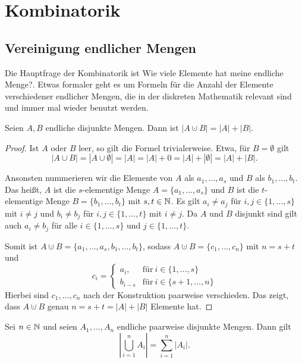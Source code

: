 \chapter{Kombinatorik} 

\section{Vereinigung endlicher Mengen} 

\begin{bem}
	Die Hauptfrage der Kombinatorik ist \glqq Wie viele Elemente hat meine endliche Menge?\grqq. Etwas formaler geht es um Formeln für die Anzahl der Elemente verschiedener endlicher Mengen, die in der diskreten Mathematik relevant sind und immer mal wieder benutzt werden.
\end{bem} 

\begin{lem} \label{lem:vereinigung:zwei}
	Seien $A, B$ endliche disjunkte Mengen. Dann ist $|A \cupdot B| = |A| + |B|$. 
\end{lem} 

\begin{proof}
	Ist $A$ oder $B$ leer, so gilt die Formel trivialerweise. Etwa, für $B = \emptyset$ gilt 
	\[
		|A \cup B| = | A \cup \emptyset| = |A| = |A| + 0 = |A| + | \emptyset| = |A| + |B|. 
	\]
	
	 Ansonsten nummerieren wir die Elemente von $A$ als $a_1,\ldots,a_s$ und $B$ als $b_1,\ldots,b_t$. Das heißt, $A$ ist die $s$-elementige Menge $A = \{a_1,\ldots,a_s\}$ und $B$ ist die $t$-elementige Menge $B = \{b_1,\ldots,b_t\}$ mit $s,t \in \mathbb{N}$. Es gilt $a_i \ne a_j$ für $i,j \in \{1,\ldots,s\}$ mit $i \ne j$   und $b_i \ne b_j$ für  $i,j \in \{1,\ldots,t\}$ mit $i \ne j$. Da $A$ und $B$ disjunkt sind gilt auch $a_i \ne b_j$ für alle $i \in \{1,\ldots,s\}$ und $j \in \{1,\ldots,t\}$. 
	 
	 Somit ist 
	 $A \cupdot B = \{a_1,\ldots,a_s,b_1,\ldots,b_t\}$, sodass $A \cupdot B = \{c_1,\ldots,c_n\}$ mit $n = s + t$ und 
	 \[
	 	c_i = \begin{cases}
	 		 a_i, & \text{für} \ i \in\{1,\ldots,s\}
	 		 \\b_{i-s}  &  \text{für} \ i \in \{s+1,\ldots,n\}
	 		\end{cases}
 	\] 
 	Hierbei sind $c_1,\ldots,c_n$ nach der Konstruktion paarweise verschieden. Das zeigt, dass $A \cupdot B$ genau $n = s+t = |A| + |B|$ Elemente hat. 
\end{proof}

\begin{lem} \label{lem:disjunkte:vereinigung}
	Sei $n \in \mathbb{N}$ und seien $A_1,\ldots,A_n$ endliche paarweise disjunkte Mengen. Dann gilt
	\[
		\left| \bigcup_{i=1}^n A_i \right| = \sum_{i=1}^n |A_i|. 
	\]
\end{lem} 

